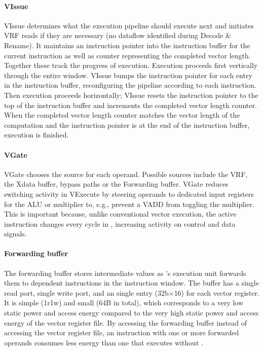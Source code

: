 \paragraph{VIssue}
VIssue determines what the execution pipeline should execute next and initiates VRF reads if they are necessary (no dataflow identified during Decode \& Rename).
% 
It maintains an instruction pointer into the instruction buffer for the current instruction as well as counter representing the completed vector length.
% 
Together these track the progress of execution.
% 
Execution proceeds first vertically through the entire window.
% 
VIssue bumps the instruction pointer for each entry in the instruction buffer, reconfiguring the pipeline according to each instruction.
% 
Then execution proceeds horizontally; VIssue resets the instruction pointer to the top of the instruction buffer and increments the completed vector length counter.
% 
When the completed vector length counter matches the vector length of the computation and the instruction pointer is at the end of the instruction buffer, execution is finished.

\paragraph{VGate}
VGate chooses the source for each operand.
% 
Possible sources include the VRF, the Xdata buffer, bypass paths or the Forwarding buffer.
% 
VGate reduces switching activity in VExecute by steering operands to dedicated input registers for the ALU or multiplier to, e.g., prevent a VADD from toggling the multiplier.
%
This is important because, unlike conventional vector execution, the active instruction changes every cycle in \manic, increasing activity on control and data signals.

\paragraph{Forwarding buffer} 
The forwarding buffer stores intermediate values as \manic's execution unit forwards them to
dependent instructions in the instruction window. 
%
The buffer has a single read port, single write port, and an single entry (32b$\times$16) for each vector register.
%
It is simple (1r1w) and small (64B in total), which corresponds to a very low static power and access energy compared to the very 
high static power and access energy of the vector register file.
%
By accessing the forwarding buffer instead of accessing the vector register
file, an instruction with one or more forwarded operands consumes less energy
than one that executes without \manic. 

